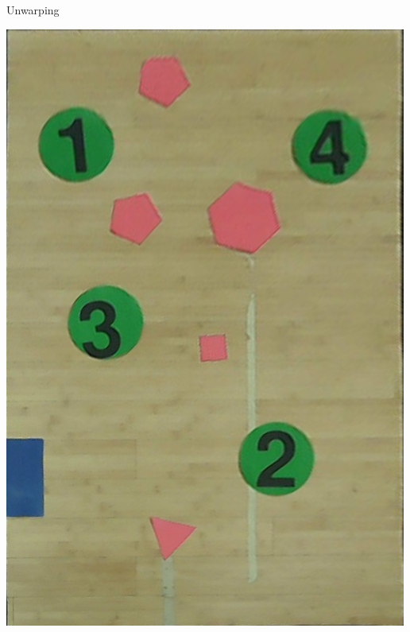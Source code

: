 \begin{frame}{Unwarping}
	\begin{center}
		\includegraphics[scale=0.25]{Immagini/Unwrapped.jpg}
	\end{center}
\end{frame}

